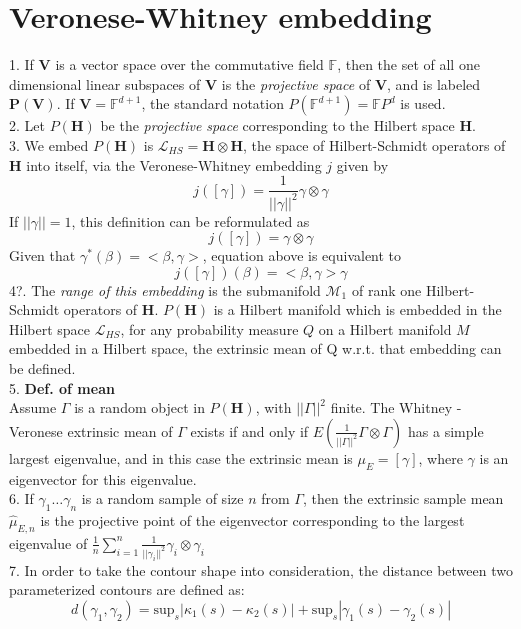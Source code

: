 \documentclass[12pt]{article}
\theoremstyle{definition}
\theoremstyle{remark}
\numberwithin{equation}{section}
\begin{document}
\section{Veronese-Whitney embedding}
1. If $\mathbf{V}$ is a vector space over the commutative field $\mathbb{F}$, then the set of all one dimensional linear subspaces of $\mathbf{V}$ is the \emph{projective space} of $\mathbf{V}$, and is labeled $\mathbf{P(V)}$. If $\mathbf{V} = \mathbb{F}^{d+1}$, the standard notation $P(\mathbb{F}^{d+1}) = \mathbb{F}P^d$ is used. \\[0.2cm]
2. Let $P(\mathbf{H})$ be the \emph{projective space} corresponding to the Hilbert space $\mathbf{H}$.\\[0.2cm]
3. We embed $P(\mathbf{H})$ is $\mathcal{L}_{HS} = \mathbf{H} \otimes \mathbf{H}$, the space of Hilbert-Schmidt operators of $\mathbf{H}$ into itself, via the Veronese-Whitney embedding $j$ given by
\[j([\gamma]) = \frac{1}{||\gamma||^2} \gamma \otimes \gamma\]
If $||\gamma|| = 1$, this definition can be reformulated as
\[j([\gamma]) = \gamma \otimes \gamma\]
Given that $\gamma^*(\beta) = <\beta , \gamma>$, equation above is equivalent to
\[j([\gamma])(\beta)= <\beta , \gamma> \gamma\]
4?. The \emph{range of this embedding} is the submanifold $\mathcal{M}_1$ of rank one Hilbert-Schmidt operators of $\mathbf{H}$.  $P(\mathbf{H})$ is a Hilbert manifold which is embedded in the Hilbert space $\mathcal{L}_{HS}$, for any probability measure $Q$ on a Hilbert manifold $M$ embedded in a Hilbert space, the extrinsic mean of Q w.r.t. that embedding can be defined. \\[0.2cm]
5. \textbf{Def. of mean} \\[0.2cm]
Assume $\Gamma$ is a random object in $P(\mathbf{H})$, with $||\Gamma||^2$ finite. The Whitney -Veronese extrinsic mean of $\Gamma$ exists if and only if $E(\frac{1}{||\Gamma||^2}\Gamma \otimes \Gamma)$ has a simple largest eigenvalue, and in this case the extrinsic mean is $\mu_E = [\gamma]$, where $\gamma$ is an eigenvector for this eigenvalue.\\[0.2cm]
6. If $\gamma_1 \dots \gamma_n$ is a random sample of size $n$ from $\Gamma$, then the extrinsic sample mean $\hat{\mu}_{E,n}$ is the projective point of the eigenvector corresponding to the largest eigenvalue of $\frac{1}{n}\sum_{i=1}^{n}\frac{1}{||\gamma_i||^2}\gamma_i \otimes \gamma_i$ \\[0.2cm]
7. In order to take the contour shape into consideration, the distance between two parameterized contours are defined as:
\[d(\gamma_1, \gamma_2) = \text{sup}_s|\kappa_1(s)-\kappa_2(s)|+\text{sup}_s|\gamma_1(s)-\gamma_2(s)|\]
\end{document}
